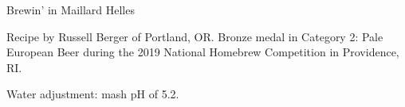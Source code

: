 \stylesection{\stylemunichhelles}

\begin{recipe}{Brewin' in Maillard Helles} %

\begin{aboutblock}
Recipe by Russell Berger of Portland, OR. Bronze medal in Category 2: Pale
European Beer during the 2019 National Homebrew Competition in Providence, RI.
\sourceaha
\end{aboutblock}


\begin{methodandtiming}
 
\begin{mashsteps}
\end{mashsteps}

\begin{fermentationsteps}
\end{fermentationsteps}

\begin{directions}
Water adjustment: mash pH of 5.2.
\end{directions}

\end{methodandtiming}

\recipebreak

\begin{ingredientsblock}

\begin{malts}
\end{malts}

\begin{hops}
\end{hops}


\end{ingredientsblock}

\end{recipe}


